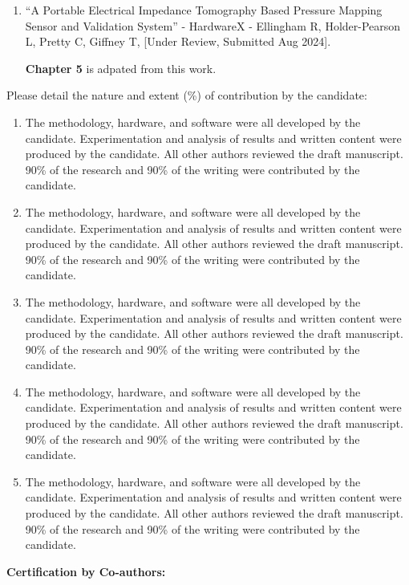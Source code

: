 \documentclass[a4paper, 11pt, oneside]{Thesis}  %
\begin{document}
{\begin{enumerate}
			\textbf{Chapter 6} is an extension of this work.
			
			\item ``A Portable Electrical Impedance Tomography Based Pressure Mapping Sensor and Validation System'' - HardwareX - Ellingham R, Holder-Pearson L, Pretty C, Giffney T, [Under Review, Submitted Aug 2024]. 
			
			\textbf{Chapter 5} is adpated from this work.
			
		\end{enumerate}
		
		Please detail the nature and extent (\%) of contribution by the candidate:
		\begin{enumerate}
			\item The methodology, hardware, and software were all developed by the candidate. Experimentation and analysis of results and written content were produced by the candidate. All other authors reviewed the draft manuscript. 90\% of the research and 90\% of the writing were contributed by the candidate.
			\item The methodology, hardware, and software were all developed by the candidate. Experimentation and analysis of results and written content were produced by the candidate. All other authors reviewed the draft manuscript. 90\% of the research and 90\% of the writing were contributed by the candidate.
			\item The methodology, hardware, and software were all developed by the candidate. Experimentation and analysis of results and written content were produced by the candidate. All other authors reviewed the draft manuscript. 90\% of the research and 90\% of the writing were contributed by the candidate.
			\item The methodology, hardware, and software were all developed by the candidate. Experimentation and analysis of results and written content were produced by the candidate. All other authors reviewed the draft manuscript. 90\% of the research and 90\% of the writing were contributed by the candidate.
			\item The methodology, hardware, and software were all developed by the candidate. Experimentation and analysis of results and written content were produced by the candidate. All other authors reviewed the draft manuscript. 90\% of the research and 90\% of the writing were contributed by the candidate.
		\end{enumerate}
	
		\textbf{Certification by Co-authors:}
		
}
\end{document}
